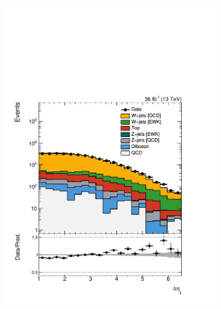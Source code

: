 \begin{figure}[]
\begin{center}
\begin{subfigure}[t]{0.24\textwidth}
            \includegraphics[width=\textwidth]{figures/vbf/prefit/singlemuon_jot12DEta_logy.pdf}
        \end{subfigure}
        \begin{subfigure}[t]{0.24\textwidth}

\end{subfigure}
\end{center}
\end{figure}
